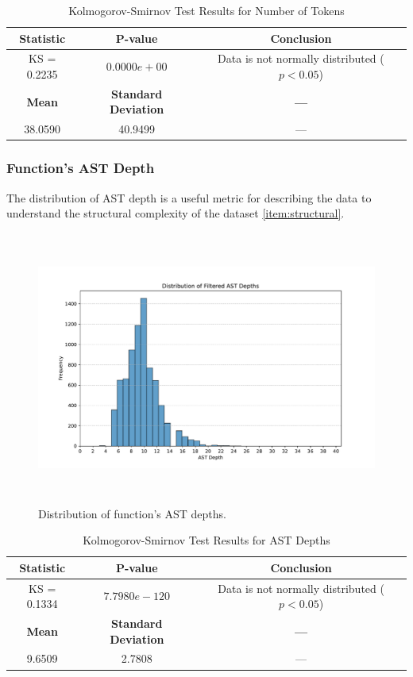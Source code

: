 \documentclass[10pt,english,a4paper]{report}
\begin{document}
\begin{table}[h!]
    \centering
    \caption{Kolmogorov-Smirnov Test Results for Number of Tokens}
    \label{tab:kolmogorov_smirnov_tokens}
    \begin{tabular}{|c|c|c|}
        \hline
        \textbf{Statistic} & \textbf{P-value} & \textbf{Conclusion} \\
        \hline
        KS = 0.2235 & $0.0000e+00$ & Data is not normally distributed ($p < 0.05$) \\
        \hline
        \textbf{Mean} & \textbf{Standard Deviation} & \textbf{---} \\
        \hline
        38.0590 & 40.9499 & --- \\
        \hline
    \end{tabular}
\end{table}

\subsubsection{Function's AST Depth}

The distribution of AST depth is a useful metric for describing the data
to understand the structural complexity of the dataset \ref{item:structural}.

\begin{figure}[H]
    \centering
    \includegraphics[width=16cm, height=9cm]{figures/ast_depths_merged.pdf}
    \caption{Distribution of function's AST depths.}
    \label{fig:ast_depths_merged}
\end{figure}

\begin{table}[h!]
    \centering
    \caption{Kolmogorov-Smirnov Test Results for AST Depths}
    \label{tab:kolmogorov_smirnov_depths}
    \begin{tabular}{|c|c|c|}
        \hline
        \textbf{Statistic} & \textbf{P-value} & \textbf{Conclusion} \\
        \hline
        KS = 0.1334 & $7.7980e-120$ & Data is not normally distributed ($p < 0.05$) \\
        \hline
        \textbf{Mean} & \textbf{Standard Deviation} & \textbf{---} \\
        \hline
        9.6509 & 2.7808 & --- \\
        \hline
    \end{tabular}
\end{table}
\end{document}
